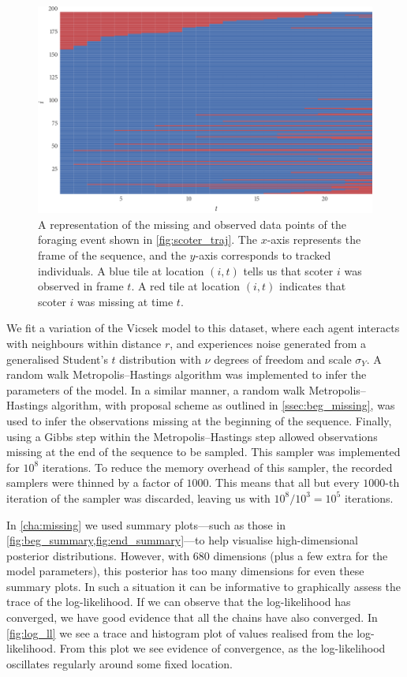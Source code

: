 \begin{figure}[tb]
  \includegraphics{data_00_missing.pdf}
  \caption{A representation of the missing and observed data points of the
    foraging event shown in \cref{fig:scoter_traj}. The $x$-axis represents the
    frame of the sequence, and the $y$-axis corresponds to tracked individuals. A
    blue tile at location $(i,t)$ tells us that scoter $i$ was observed in frame
    $t$. A red tile at location $(i,t)$ indicates that scoter $i$ was missing at
    time $t$.}
  \label{fig:scoter_missing}
\end{figure}

We fit a variation of the Vicsek model to this dataset, where each agent
interacts with neighbours within distance $r$, and experiences noise generated
from a generalised Student's $t$ distribution with $\nu$ degrees of freedom and
scale $\sigma_Y$. A random walk Metropolis--Hastings algorithm was implemented
to infer the parameters of the model. In a similar manner, a random walk
Metropolis--Hastings algorithm, with proposal scheme as outlined in
\cref{ssec:beg_missing}, was used to infer the observations missing at the
beginning of the sequence. Finally, using a Gibbs step within the
Metropolis--Hastings step allowed observations missing at the end of the
sequence to be sampled. This sampler was implemented for $10^8$ iterations. To
reduce the memory overhead of this sampler, the recorded samplers were thinned
by a factor of $1000$. This means that all but every $1000$-th iteration of the
sampler was discarded, leaving us with $10^8 / 10^3 = 10^5$ iterations.

In \cref{cha:missing} we used summary plots---such as those in
\cref{fig:beg_summary,fig:end_summary}---to help visualise high-dimensional
posterior distributions. However, with $680$ dimensions (plus a few extra for
the model parameters), this posterior has too many dimensions for even these
summary plots. In such a situation it can be informative to graphically assess
the trace of the log-likelihood. If we can observe that the log-likelihood has
converged, we have good evidence that all the chains have also converged. In
\cref{fig:log_ll} we see a trace and histogram plot of values realised from the
log-likelihood. From this plot we see evidence of convergence, as the
log-likelihood oscillates regularly around some fixed location.


